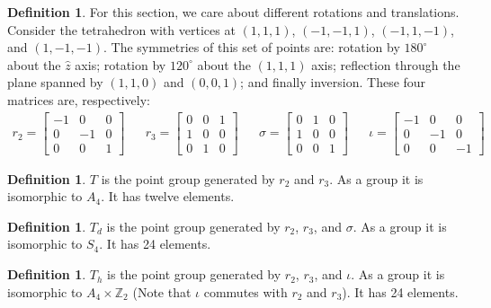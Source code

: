 \documentclass[12pt, letterpaper]{article}
\theoremstyle{definition} %
\newtheorem{defn}[thm]{Definition} %
\begin{document}
\begin{defn}
  For this section, we care about different rotations and translations. Consider the tetrahedron with
  vertices at $(1,1,1)$, $(-1,-1,1)$, $(-1,1,-1)$, and $(1,-1,-1)$. The symmetries of this set of points are:
  rotation by $180^\circ$ about the $\hat{z}$ axis; rotation by $120^\circ$ about the $(1,1,1)$ axis;
  reflection through the plane spanned by $(1,1,0)$ and $(0,0,1)$; and finally inversion. These four matrices are, respectively:
  \begin{align*}
    r_2=
  \begin{bmatrix}
    -1& 0 & 0 \\ 0 & -1 & 0 \\ 0 & 0 & 1
  \end{bmatrix}
  & & r_3=
  \begin{bmatrix}
    0 & 0 & 1 \\ 1 & 0 & 0 \\ 0 & 1 & 0
  \end{bmatrix}
  & & \sigma=
  \begin{bmatrix}
    0 & 1 & 0 \\ 1 & 0 & 0 \\ 0 & 0 & 1
  \end{bmatrix}
  & & \iota=
  \begin{bmatrix}
    -1& 0 & 0 \\ 0 & -1 & 0 \\ 0 & 0 & -1
  \end{bmatrix}
  \end{align*}
\end{defn}

\begin{defn}
  $T$ is the point group generated by $r_2$ and $r_3$. As a group it is isomorphic to $A_4$. It has twelve elements.
\end{defn}

\begin{defn}
  $T_d$ is the point group generated by $r_2$, $r_3$, and $\sigma$. As a group it is isomorphic to $S_4$. It has 24 elements.
\end{defn}

\begin{defn}
  $T_h$ is the point group generated by $r_2$, $r_3$, and $\iota$. As a group it is isomorphic to $A_4\times \mathbb{Z}_2$ (Note that $\iota$ commutes with $r_2$ and $r_3$). It has 24 elements.
\end{defn}
\end{document}
